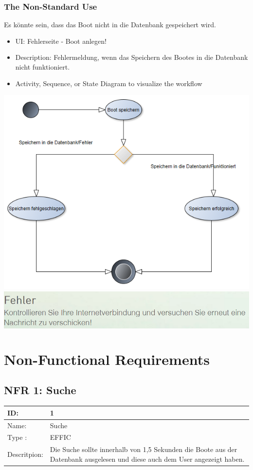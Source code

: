 \documentclass[12pt]{article}
\theoremstyle{definition}
\begin{document}
\subsubsection{The Non-Standard Use}
Es könnte sein, dass das Boot nicht in die Datenbank gespeichert wird.
\begin{itemize}
	\item UI: Fehlerseite - Boot anlegen!
	\item Description: Fehlermeldung, wenn das Speichern des Bootes in die Datenbank nicht funktioniert.
	\item Activity, Sequence, or State Diagram to visualize the workflow
\end{itemize}
\includegraphics[height=0.40\textwidth]{Boot_anlegen_Fehler.PNG}
\includegraphics[height=0.40\textwidth]{Fehler2.PNG}
\pagebreak

\section{Non-Functional Requirements}

\subsection{NFR 1: Suche}
\begin{tabular}{|p{.2\linewidth}|p{.65\linewidth}|}
\hline 
ID: & 1 \\ \hline
Name: & Suche \\ \hline
Type	: & EFFIC \\ \hline
Descritpion: &  Die Suche sollte innerhalb von 1,5 Sekunden die Boote aus der Datenbank ausgelesen und diese auch dem User angezeigt haben.\\ \hline
\end{tabular}
\end{document}
